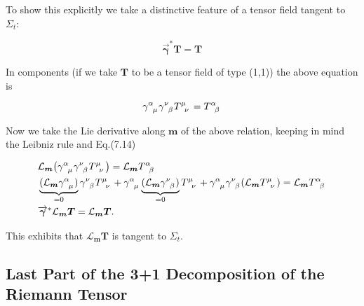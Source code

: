\documentclass[12pt]{article}
\renewcommand{\vec}[1]{\bm{#1}}
\numberwithin{equation}{section}
\numberwithin{theorem}{subsection}
\begin{document}
To show this explicitly we take a distinctive feature of a tensor field tangent to $\Sigma_{t}$:

\begin{equation}

    \overrightarrow{\vec{\gamma}}^{*} \vec{T} = \vec{T}

\end{equation}

In components (if we take $\vec{T}$ to be a tensor field of type (1,1)) the above equation is

\begin{equation*}

    \tensor{\gamma}{^\alpha_\mu}\tensor{\gamma}{^\nu_\beta}\tensor{T}{^\mu_\nu} = \tensor{T}{^\alpha_\beta}

\end{equation*}

Now we take the Lie derivative along $\vec{m}$ of the above relation, keeping in mind the Leibniz rule and Eq.(7.14)

\begin{align*}

    &\mathcal{L}_{\vec{m}}\big(\tensor{\gamma}{^\alpha_\mu}\tensor{\gamma}{^\nu_\beta}\tensor{T}{^\mu_\nu}\big) = \mathcal{L}_{\vec{m}} \tensor{T}{^\alpha_\beta} \\

    &\underbrace{(\mathcal{L}_{\vec{m}}\tensor{\gamma}{^\alpha_\mu})}_{= 0}\tensor{\gamma}{^\nu_\beta}\tensor{T}{^\mu_\nu} + \tensor{\gamma}{^\alpha_\mu}\underbrace{(\mathcal{L}_{\vec{m}}\tensor{\gamma}{^\nu_\beta})}_{= 0}\tensor{T}{^\mu_\nu} + \tensor{\gamma}{^\alpha_\mu}\tensor{\gamma}{^\nu_\beta} (\mathcal{L}_{\vec{m}}\tensor{T}{^\mu_\nu}) = \mathcal{L}_{\vec{m}} \tensor{T}{^\alpha_\beta} \\

    &\overrightarrow{\vec{\gamma}}^{*}\mathcal{L}_{\vec{m}}\vec{T} = \mathcal{L}_{\vec{m}}\vec{T}.

\end{align*}

This exhibits that $\mathcal{L}_{\vec{m}}\vec{T}$ is tangent to $\Sigma_{t}$. 

\subsection{Last Part of the 3+1 Decomposition of the Riemann Tensor}
\end{document}

